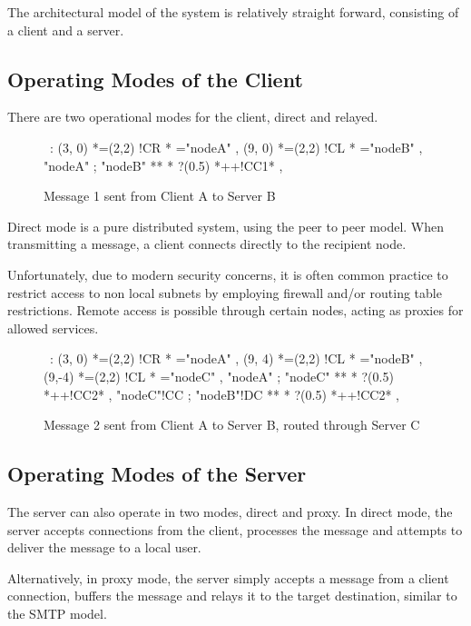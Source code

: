 The architectural model of the system is relatively straight forward,
consisting of a client and a server. 

\subsection{Operating Modes of the Client}

There are two operational modes for the client, direct and relayed.

\begin{figure}[hbt]

\begin{center}
\ \xy<1cm,0cm>:
(3, 0) *=(2,2) !CR  *\frm{-} ="nodeA" , 
(9, 0) *=(2,2) !CL  *\frm{=} ="nodeB" , 
"nodeA" ; "nodeB" **\dir{-} *\dir{>} ?(0.5) *++!CC{1}* , 
\endxy
\end{center}

\caption{Message 1 sent from Client A to Server B}

\end{figure}

Direct mode is a pure distributed system, using the peer to peer model.
When transmitting a message, a client connects directly to the
recipient node.


Unfortunately, due to modern security concerns, it is often common 
practice to restrict access to non local subnets by employing firewall
and/or routing table restrictions. Remote access is possible through
certain nodes, acting as proxies for allowed services. 

\begin{figure}[hbt]

\begin{center}
\ \xy<1cm,0cm>:
(3, 0) *=(2,2) !CR  *\frm{-} ="nodeA" , 
(9, 4) *=(2,2) !CL  *\frm{=} ="nodeB" , 
(9,-4) *=(2,2) !CL  *\frm{=} ="nodeC" , 
"nodeA" ; "nodeC" **\dir{-} *\dir{>} ?(0.5) *++!CC{2}* , 
"nodeC"!CC ; "nodeB"!DC **\dir{-} *\dir{>} ?(0.5) *++!CC{2}* , 
\endxy
\end{center}

\caption{Message 2 sent from Client A to Server B, routed through Server C}

\end{figure}

\subsection{Operating Modes of the Server}

The server can also operate in two modes, direct and proxy. In direct
mode, the server accepts connections from the client, processes the
message and attempts to deliver the message to a local user.


Alternatively, in proxy mode, the server simply accepts a message from a
client connection, buffers the message and relays it to the target 
destination, similar to the SMTP model.

